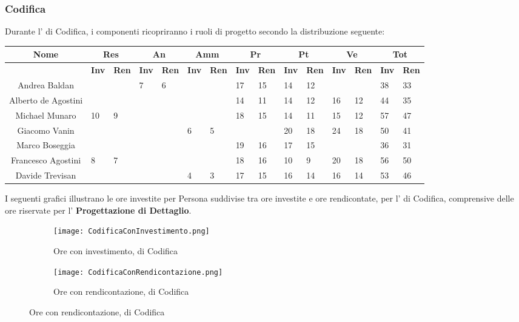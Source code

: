 \documentclass{scalatekids-article}
\begin{document}
\subsubsection{Codifica}
Durante l' di Codifica, i componenti ricopriranno i ruoli di progetto secondo la distribuzione seguente:
\begin{center}
  \scriptsize
  \begin{tabular}{| c | p{0.35cm}  p{0.35cm} | p{0.35cm}  p{0.35cm} | p{0.35cm}  p{0.35cm} | p{0.35cm}  p{0.35cm} | p{0.35cm}  p{0.35cm} | p{0.35cm}  p{0.35cm} | p{0.35cm}  p{0.35cm} |}
    \hline
    \textbf{Nome} & \multicolumn{2}{|c|}{\textbf{Res}} & \multicolumn{2}{|c|}{\textbf{An}} & \multicolumn{2}{|c|}{\textbf{Amm}} & \multicolumn{2}{|c|}{\textbf{Pr}} & \multicolumn{2}{|c|}{\textbf{Pt}} & \multicolumn{2}{|c|}{\textbf{Ve}} & \multicolumn{2}{|c|}{\textbf{Tot}}\\
    \hline
    & \textbf{Inv} & \textbf{Ren} & \textbf{Inv} & \textbf{Ren} & \textbf{Inv} & \textbf{Ren} & \textbf{Inv} & \textbf{Ren} & \textbf{Inv} & \textbf{Ren} & \textbf{Inv} & \textbf{Ren} & \textbf{Inv} & \textbf{Ren}\\
    \hline
    Andrea Baldan & & & 7 & 6 & & & 17 & 15 & 14 & 12 & & & 38 & 33\\
    Alberto de Agostini & & & & & & & 14 & 11 & 14 & 12 & 16 & 12 & 44 & 35\\
    Michael Munaro & 10 & 9 & & & & & 18 & 15 & 14 & 11 & 15 & 12 & 57 & 47\\
    Giacomo Vanin & & & & & 6 & 5 & & & 20 & 18 & 24 & 18 & 50 & 41\\
    Marco Boseggia & & & & & & & 19 & 16 & 17 & 15 & & & 36 & 31\\
    Francesco Agostini & 8 & 7 & & & & & 18 & 16 & 10 & 9 & 20 & 18 & 56 & 50\\
    Davide Trevisan & & & & & 4 & 3 & 17 & 15 & 16 & 14 & 16 & 14 & 53 & 46\\
    \hline
  \end{tabular}
\end{center}
\normalsize I seguenti grafici illustrano le ore investite per Persona suddivise
tra ore investite e ore rendicontate, per l' di Codifica, comprensive
delle ore riservate per l' \textbf{Progettazione di Dettaglio}.
\begin{figure}[H]
  \begin{subfigure}[H]{0.47\textwidth}
    \texttt{[image: CodificaConInvestimento.png]}
    \caption*{Ore con investimento,  di Codifica}
  \end{subfigure}
  \qquad
  \begin{subfigure}[H]{0.47\textwidth}
    \texttt{[image: CodificaConRendicontazione.png]}
    \caption*{Ore con rendicontazione,  di Codifica}
  \end{subfigure}
\end{figure}
\end{document}
